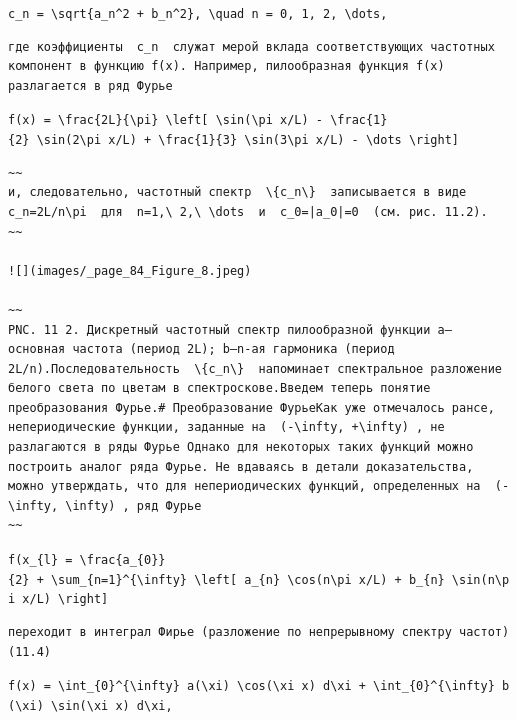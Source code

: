 \documentclass[
  ukrainian,
]{article}
\begin{document}
\texttt{c\_n\ =\ \textbackslash{}sqrt\{a\_n\^{}2\ +\ b\_n\^{}2\},\ \textbackslash{}quad\ n\ =\ 0,\ 1,\ 2,\ \textbackslash{}dots,}

\begin{verbatim}
где коэффициенты  c_n  служат мерой вклада соответствующих частотных компонент в функцию f(x). Например, пилообразная функция f(x) разлагается в ряд Фурье
\end{verbatim}

\texttt{f(x)\ =\ \textbackslash{}frac\{2L\}\{\textbackslash{}pi\}\ \textbackslash{}left{[}\ \textbackslash{}sin(\textbackslash{}pi\ x/L)\ -\ \textbackslash{}frac\{1\}\{2\}\ \textbackslash{}sin(2\textbackslash{}pi\ x/L)\ +\ \textbackslash{}frac\{1\}\{3\}\ \textbackslash{}sin(3\textbackslash{}pi\ x/L)\ -\ \textbackslash{}dots\ \textbackslash{}right{]}}

\begin{verbatim}
~~
и, следовательно, частотный спектр  \{c_n\}  записывается в виде  c_n=2L/n\pi  для  n=1,\ 2,\ \dots  и  c_0=|a_0|=0  (см. рис. 11.2).
~~

![](images/_page_84_Figure_8.jpeg)

~~
PNC. 11 2. Дискретный частотный спектр пилообразной функции a— основная частота (период 2L); b—n-ая гармоника (период 2L/n).Последовательность  \{c_n\}  напоминает спектральное разложение белого света по цветам в спектроскове.Введем теперь понятие преобразования Фурье.# Преобразование ФурьеКак уже отмечалось рансе, непериодические функции, заданные на  (-\infty, +\infty) , не разлагаются в ряды Фурье Однако для некоторых таких функций можно построить аналог ряда Фурье. Не вдаваясь в детали доказательства, можно утверждать, что для непериодических функций, определенных на  (-\infty, \infty) , ряд Фурье
~~
\end{verbatim}

\texttt{f(x\_\{l\}\ =\ \textbackslash{}frac\{a\_\{0\}\}\{2\}\ +\ \textbackslash{}sum\_\{n=1\}\^{}\{\textbackslash{}infty\}\ \textbackslash{}left{[}\ a\_\{n\}\ \textbackslash{}cos(n\textbackslash{}pi\ x/L)\ +\ b\_\{n\}\ \textbackslash{}sin(n\textbackslash{}pi\ x/L)\ \textbackslash{}right{]}}

\begin{verbatim}
переходит в интеграл Фирье (разложение по непрерывному спектру частот)(11.4)
\end{verbatim}

\texttt{f(x)\ =\ \textbackslash{}int\_\{0\}\^{}\{\textbackslash{}infty\}\ a(\textbackslash{}xi)\ \textbackslash{}cos(\textbackslash{}xi\ x)\ d\textbackslash{}xi\ +\ \textbackslash{}int\_\{0\}\^{}\{\textbackslash{}infty\}\ b(\textbackslash{}xi)\ \textbackslash{}sin(\textbackslash{}xi\ x)\ d\textbackslash{}xi,}
\end{document}
